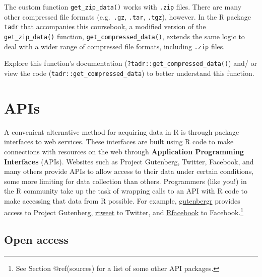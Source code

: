 \documentclass[
  letterpaper,
]{latex/krantz}
\begin{document}
\begin{tcolorbox}[enhanced jigsaw, opacitybacktitle=0.6, breakable, colframe=quarto-callout-warning-color-frame, arc=.35mm, left=2mm, leftrule=.75mm, title=\textcolor{quarto-callout-warning-color}{\faExclamationTriangle}\hspace{0.5em}{Tip}, opacityback=0, colback=white, toptitle=1mm, rightrule=.15mm, titlerule=0mm, bottomtitle=1mm, bottomrule=.15mm, coltitle=black, colbacktitle=quarto-callout-warning-color!10!white, toprule=.15mm]
The custom function \texttt{get\_zip\_data()} works with \texttt{.zip}
files. There are many other compressed file formats (e.g.~\texttt{.gz},
\texttt{.tar}, \texttt{.tgz}), however. In the R package \texttt{tadr}
that accompanies this coursebook, a modified version of the
\texttt{get\_zip\_data()} function, \texttt{get\_compressed\_data()},
extends the same logic to deal with a wider range of compressed file
formats, including \texttt{.zip} files.

Explore this function's documentation
(\texttt{?tadr::get\_compressed\_data()}) and/ or view the code
(\texttt{tadr::get\_compressed\_data}) to better understand this
function.
\end{tcolorbox}

\hypertarget{apis}{%
\section{APIs}\label{apis}}

A convenient alternative method for acquiring data in R is through
package interfaces to web services. These interfaces are built using R
code to make connections with resources on the web through
\textbf{Application Programming Interfaces} (APIs). Websites such as
Project Gutenberg, Twitter, Facebook, and many others provide APIs to
allow access to their data under certain conditions, some more limiting
for data collection than others. Programmers (like you!) in the R
community take up the task of wrapping calls to an API with R code to
make accessing that data from R possible. For example,
\href{https://CRAN.R-project.org/package=gutenbergr}{gutenbergr}
provides access to Project Gutenberg,
\href{https://CRAN.R-project.org/package=rtweet}{rtweet} to Twitter, and
\href{https://CRAN.R-project.org/package=Rfacebook}{Rfacebook} to
Facebook.\footnote{See Section @ref(sources) for a list of some other
  API packages.}

\hypertarget{open-access}{%
\subsection{Open access}\label{open-access}}
\end{document}
